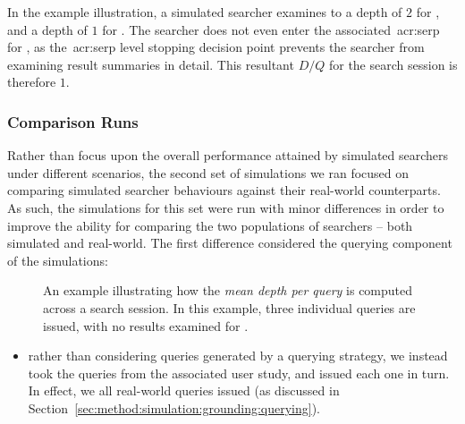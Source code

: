 In the example illustration, a simulated searcher examines to a depth of $2$ for , and a depth of $1$ for . The searcher does not even enter the associated~\gls{acr:serp} for , as the~\gls{acr:serp} level stopping decision point prevents the searcher from examining result summaries in detail. This resultant $D/Q$ for the search session is therefore $1$.

\vspace*{-4mm}
\subsubsection{Comparison Runs}\label{sec:method:simulation:runs:comparison}
Rather than focus upon the overall performance attained by simulated searchers under different scenarios, the second set of simulations we ran focused on comparing simulated searcher behaviours against their real-world counterparts. As such, the simulations for this set were run with minor differences in order to improve the ability for comparing the two populations of searchers -- both simulated and real-world. The first difference considered the querying component of the simulations:

\begin{figure}[t!]
    \centering
    \caption[Example depth per query computation]{An example illustrating how the \emph{mean depth per query} is computed across a search session. In this example, three individual queries are issued, with no results examined for .}
    \label{fig:depth_per_query}
\end{figure}

\begin{itemize}
    \item{rather than considering queries generated by a querying strategy, we instead took the queries from the associated user study, and issued each one in turn. In effect, we  all real-world queries issued (as discussed in Section~\ref{sec:method:simulation:grounding:querying}).}
\end{itemize}

